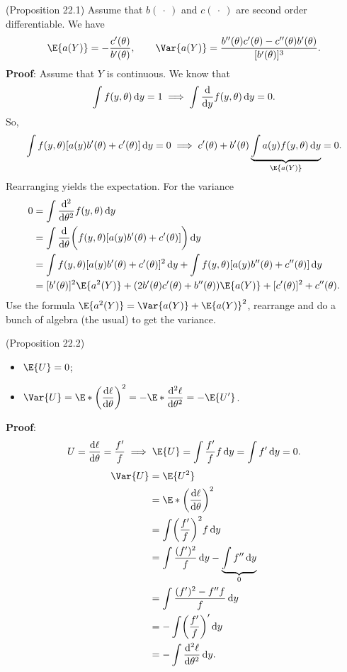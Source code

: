 \begin{Remark}{(Proposition 22.1)}{}
    Assume that $ b(\:\cdot\:) $ and $ c(\:\cdot\:) $
    are second order differentiable. We have
    \[ \E{a(Y)}=-\frac{c'(\theta)}{b'(\theta)},
        \qquad \Var{a(Y)}=\frac{b''(\theta)c'(\theta)-c''(\theta)b'(\theta)}{[b'(\theta)]^3}. \]
    \tcblower{}
    \textbf{Proof}: Assume that $ Y $ is continuous. We know that
    \[ \int f(y,\theta)\odif{y}=1\implies \int \odv*{f(y,\theta)}{y}\odif{y}=0. \]
    So,
    \[ \int f(y,\theta)[a(y)b'(\theta)+c'(\theta)]\odif{y}=0
        \implies c'(\theta)+b'(\theta)\underbrace{\int a(y)f(y,\theta)\odif{y}}_{\E{a(Y)}}=0. \]
    Rearranging yields the expectation. For the variance
    \begin{align*}
        0
         & =\int \odv*[order=2]{f(y,\theta)}{\theta}\odif{y}                                 \\
         & =\int \odv*{\biggl(f(y,\theta)[a(y)b'(\theta)+c'(\theta)]\biggr)}{\theta}\odif{y} \\
         & =\int f(y,\theta)[a(y)b'(\theta)+c'(\theta)]^2\odif{y}
        +\int f(y,\theta)[a(y)b''(\theta)+c''(\theta)]\odif{y}                               \\
         & =[b'(\theta)]^2\E{a^2(Y)}+(2b'(\theta)c'(\theta)+b''(\theta))\E{a(Y)}
        +[c'(\theta)]^2+c''(\theta).
    \end{align*}
    Use the formula $ \E{a^2(Y)}=\Var{a(Y)}+\E{a(Y)}^2 $, rearrange
    and do a bunch of algebra (the usual) to get the variance.
\end{Remark}
\begin{Remark}{(Proposition 22.2)}{}
    \begin{itemize}
        \item $ \displaystyle \E{U}=0 $;
        \item $ \displaystyle \Var{U}=\E*{\biggl(\odv{\ell}{\theta}\biggr)^2}=-\E*{\odv[order=2]{\ell}{\theta}}=-\E{U'} $.
    \end{itemize}
    \tcblower{}
    \textbf{Proof}:
    \[ U=\odv{\ell}{\theta}=\frac{f'}{f}\implies \E{U}=\int \frac{f'}{f}f\odif{y}=
        \int f'\odif{y}=0. \]
    \begin{align*}
        \Var{U}
         & =\E{U^2}                                                       \\
         & =\E*{\biggl(\odv{\ell}{\theta}\biggr)^2}                       \\
         & =\int \biggl(\frac{f'}{f}\biggr)^2 f\odif{y}                   \\
         & =\int \frac{(f')^2}{f}\odif{y}-\underbrace{\int f''\odif{y}}_0 \\
         & =\int \frac{(f')^2-f''f}{f}\odif{y}                            \\
         & =-\int \biggl(\frac{f'}{f}\biggr)'\odif{y}                     \\
         & =-\int \odv[order=2]{\ell}{\theta}\odif{y}.
    \end{align*}
\end{Remark}
